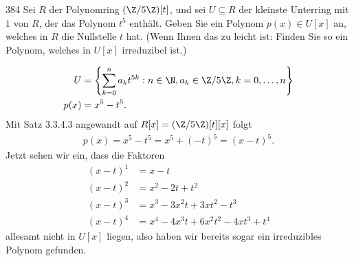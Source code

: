 \begin{algebraUE}{384}
Sei $R$ der Polynomring $(\Z/5\Z)[t]$, und sei $U \subseteq R$ der kleinste
Unterring mit $1$ von $R$, der das Polynom $t^5$ enthält. Geben Sie ein Polynom
$p(x) \in U[x]$ an, welches in $R$ die Nullstelle $t$ hat. (Wenn Ihnen das zu
leicht ist: Finden Sie so ein Polynom, welches in $U[x]$ irreduzibel ist.)
\end{algebraUE}

\begin{solution}
\begin{align*}
  U &= \left\{\sum_{k = 0}^na_kt^{5k}: n \in \N, a_k \in \Z/5\Z, k = 0,\dots,n\right\} \\
  p(x) &= x^5 - t^5.
\end{align*}
Mit Satz 3.3.4.3 angewandt auf $R[x] = (\Z/5\Z)[t][x]$ folgt
\begin{align*}
  p(x) = x^5 - t^5 =  x^5 + (-t)^5 = (x - t)^5.
\end{align*}
Jetzt sehen wir ein, dass die Faktoren
\begin{align*}
  (x - t)^1 &= x - t \\
  (x - t)^2 &= x^2 - 2t + t^2 \\
  (x - t)^3 &= x^3 -3x^2t + 3xt^2 - t^3 \\
  (x - t)^4 &= x^4 -4x^3t + 6x^2t^2 - 4xt^3 + t^4
\end{align*}
allesamt nicht in $U[x]$ liegen, also haben wir bereits sogar ein irreduzibles
Polynom gefunden.
\end{solution}

